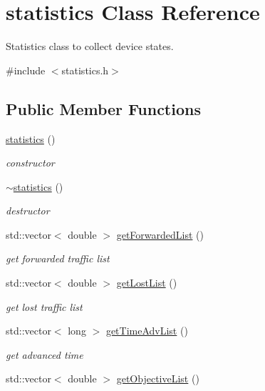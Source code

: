 \hypertarget{classstatistics}{\section{statistics \-Class \-Reference}
\label{classstatistics}
}


\-Statistics class to collect device states.  




{\ttfamily \#include $<$statistics.\-h$>$}

\subsection*{\-Public \-Member \-Functions}
\begin{DoxyCompactItemize}
\item 
\hyperlink{classstatistics_a31d6750c3251c979f5c2d013984e1162}{statistics} ()
\begin{DoxyCompactList}\small\item\em constructor \end{DoxyCompactList}\item 
\hyperlink{classstatistics_a8cf720227802726be118712dc6616f94}{$\sim$statistics} ()
\begin{DoxyCompactList}\small\item\em destructor \end{DoxyCompactList}\item 
std\-::vector$<$ double $>$ \hyperlink{classstatistics_ab2c51b1a4cc826a09473860faf565360}{get\-Forwarded\-List} ()
\begin{DoxyCompactList}\small\item\em get forwarded traffic list \end{DoxyCompactList}\item 
std\-::vector$<$ double $>$ \hyperlink{classstatistics_a99795974e97556668c02c5005b2df895}{get\-Lost\-List} ()
\begin{DoxyCompactList}\small\item\em get lost traffic list \end{DoxyCompactList}\item 
std\-::vector$<$ long $>$ \hyperlink{classstatistics_a857adb219cf897c105a9e0aceca4188a}{get\-Time\-Adv\-List} ()
\begin{DoxyCompactList}\small\item\em get advanced time \end{DoxyCompactList}\item 
std\-::vector$<$ double $>$ \hyperlink{classstatistics_a47b6c911143330c41faa573bc534aee1}{get\-Objective\-List} ()

\end{DoxyCompactItemize}

